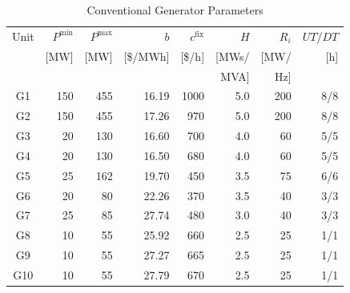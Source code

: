 \documentclass[journal]{IEEEtran}
\begin{document}
\begin{table}[!t]
\renewcommand{\arraystretch}{1.2}
\caption{Conventional Generator Parameters}
\label{tab:gen}
\centering\footnotesize
\begin{tabular}{crrrrrrr}
\toprule
Unit & $P^{\min}$ & $P^{\max}$ & $b$ & $c^{\text{fix}}$
     & $H$ & $R_i$ & $UT$/$DT$\\
     & [MW] & [MW] & [\$/MWh] & [\$/h]
     & [MWs/ & [MW/ & [h]\\
     & & & & & MVA] & Hz] &\\
\midrule
G1  & 150 & 455 & 16.19 & 1000 & 5.0 & 200 & 8/8 \\
G2  & 150 & 455 & 17.26 &  970 & 5.0 & 200 & 8/8 \\
G3  &  20 & 130 & 16.60 &  700 & 4.0 &  60 & 5/5 \\
G4  &  20 & 130 & 16.50 &  680 & 4.0 &  60 & 5/5 \\
G5  &  25 & 162 & 19.70 &  450 & 3.5 &  75 & 6/6 \\
G6  &  20 &  80 & 22.26 &  370 & 3.5 &  40 & 3/3 \\
G7  &  25 &  85 & 27.74 &  480 & 3.0 &  40 & 3/3 \\
G8  &  10 &  55 & 25.92 &  660 & 2.5 &  25 & 1/1 \\
G9  &  10 &  55 & 27.27 &  665 & 2.5 &  25 & 1/1 \\
G10 &  10 &  55 & 27.79 &  670 & 2.5 &  25 & 1/1 \\
\bottomrule
\end{tabular}
\end{table}
\end{document}

